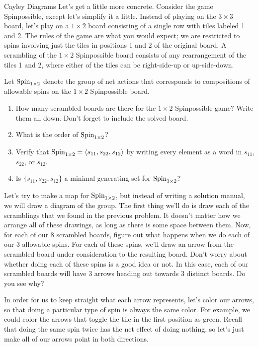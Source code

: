 \begin{section}{Cayley Diagrams}
Let's get a little more concrete.  Consider the game Spinpossible, except let's simplify it a little.  Instead of playing on the $3\times 3$ board, let's play on a $1\times 2$ board consisting of a single row with tiles labeled 1 and 2.  The rules of the game are what you would expect; we are restricted to spins involving just the tiles in positions 1 and 2 of the original board.  A scrambling of the $1\times 2$ Spinpossible board consists of any rearrangement of the tiles 1 and 2, where either of the tiles can be right-side-up or up-side-down.  

\begin{problem}
Let $\operatorname{Spin}_{1\times 2}$ denote the group of net actions that corresponds to compositions of allowable spins on the $1\times 2$ Spinpossible board.
\begin{enumerate}[label=\rm{(\alph*)}]
\item How many scrambled boards are there for the $1\times 2$ Spinpossible game?  Write them all down. Don't forget to include the solved board.
\item What is the order of $\operatorname{Spin}_{1\times 2}$?
\item Verify that $\operatorname{Spin}_{1\times 2}=\langle s_{11}, s_{22}, s_{12}\rangle$ by writing every element as a word in $s_{11}$, $s_{22}$, or $s_{12}$.
\item Is $\{s_{11}, s_{22}, s_{12}\}$ a minimal generating set for $\operatorname{Spin}_{1\times 2}$?
\end{enumerate}
\end{problem}

Let's try to make a map for $\operatorname{Spin}_{1\times 2}$, but instead of writing a solution manual, we will draw a diagram of the group.  The first thing we'll do is draw each of the scramblings that we found in the previous problem.  It doesn't matter how we arrange all of these drawings, as long as there is some space between them.  Now, for each of our 8 scrambled boards, figure out what happens when we do each of our 3 allowable spins.  For each of these spins, we'll draw an arrow from the scrambled board under consideration to the resulting board.  Don't worry about whether doing each of these spins is a good idea or not.  In this case, each of our scrambled boards will have 3 arrows heading out towards 3 distinct boards.  Do you see why?  

In order for us to keep straight what each arrow represents, let's color our arrows, so that doing a particular type of spin is always the same color.  For example, we could color the arrows that toggle the tile in the first position as green.  Recall that doing the same spin twice has the net effect of doing nothing, so let's just make all of our arrows point in both directions.


\end{section}

